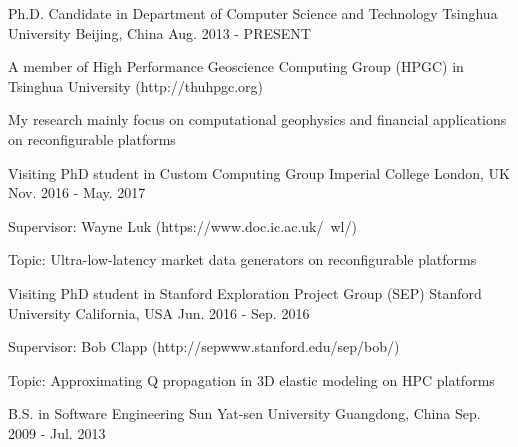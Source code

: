 \documentclass[11pt, a4paper]{awesome-cv}
\begin{document}
\begin{cventries}

  \cventry
    {Ph.D. Candidate in Department of Computer Science and Technology} %
    {Tsinghua University} %
    {Beijing, China} %
    {Aug. 2013 - PRESENT} %
    {
      \begin{cvitems} %
        \item {A member of High Performance Geoscience Computing Group (HPGC) in Tsinghua University (http://thuhpgc.org)}
        \item {My research mainly focus on computational geophysics and financial applications on reconfigurable platforms}
      \end{cvitems}
    }
    
  \cventry
    {Visiting PhD student in Custom Computing Group} %
    {Imperial College} %
    {London, UK} %
    {Nov. 2016 - May. 2017} %
    {
      \begin{cvitems} %
        \item {Supervisor: Wayne Luk (https://www.doc.ic.ac.uk/~wl/)}      
        \item {Topic: Ultra-low-latency market data generators on reconfigurable platforms}
      \end{cvitems}
    }
    
  \cventry
    {Visiting PhD student in Stanford Exploration Project Group (SEP)} %
    {Stanford University} %
    {California, USA} %
    {Jun. 2016 - Sep. 2016} %
    {
      \begin{cvitems} %
        \item {Supervisor: Bob Clapp (http://sepwww.stanford.edu/sep/bob/)}		
        \item {Topic: Approximating Q propagation in 3D elastic modeling on HPC platforms}
      \end{cvitems}
    }



  \cventry
    {B.S. in Software Engineering} %
    {Sun Yat-sen University} %
    {Guangdong, China} %
    {Sep. 2009 - Jul. 2013} %
    {}
\end{cventries}

\end{document}
